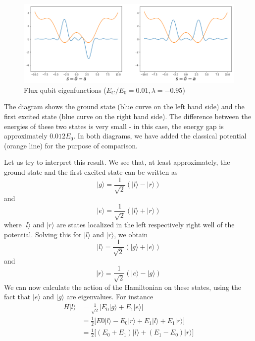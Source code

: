 \documentclass[a4paper, draft]{article}
\theoremstyle{own}
\theoremstyle{remark}
\begin{document}
\begin{figure}[ht]
\centering
\includegraphics[width=1\linewidth]{images/FluxQubitEigenfunctions}
\caption[Flux qubit eigenfunctions ($E_C / E_0 = 0.01, \lambda = -0.95$)]{Flux qubit eigenfunctions ($E_C / E_0 = 0.01, \lambda = -0.95$)}
\label{fig:FluxQubitEigenfunctions}
\end{figure}

The diagram shows the ground state (blue curve on the left hand side) and the first excited state (blue curve on the right hand side). The difference between the energies of these two states is very small - in this case, the energy gap is approximately $0.012 E_0$. In both diagrams, we have added the classical potential (orange line) for the purpose of comparison.

Let us try to interpret this result. We see that, at least approximately, the ground state and the first excited state can be written as
$$
|g \rangle = \frac{1}{\sqrt{2}} (|l \rangle - |r \rangle)
$$
and
$$
|e \rangle = \frac{1}{\sqrt{2}} (|l \rangle + |r \rangle)
$$
where $|l \rangle$ and $|r \rangle$ are states localized in the left respectively right well of the potential. Solving this for $|l \rangle$ and $|r \rangle$, we obtain
$$
|l \rangle = \frac{1}{\sqrt{2}} (|g \rangle + |e \rangle )
$$
and
$$
|r \rangle = \frac{1}{\sqrt{2}} (|e \rangle - |g \rangle )
$$
We can now calculate the action of the Hamiltonian on these states, using the fact that $|e \rangle$ and $|g \rangle$ are eigenvalues. 
For instance
\begin{align*}
H |l \rangle &= \frac{1}{\sqrt{2}} \big[  E_0 |g \rangle + E_1 |e \rangle \big] \\
&= \frac{1}{2} \big[ E0 |l \rangle - E_0 |r \rangle + E_1 | l \rangle + E_1 |r \rangle \big] \\
&= \frac{1}{2} \big[  (E_0 + E_1) |l \rangle + (E_1 - E_0) |r \rangle
\big] 
\end{align*}
	
\end{document}
